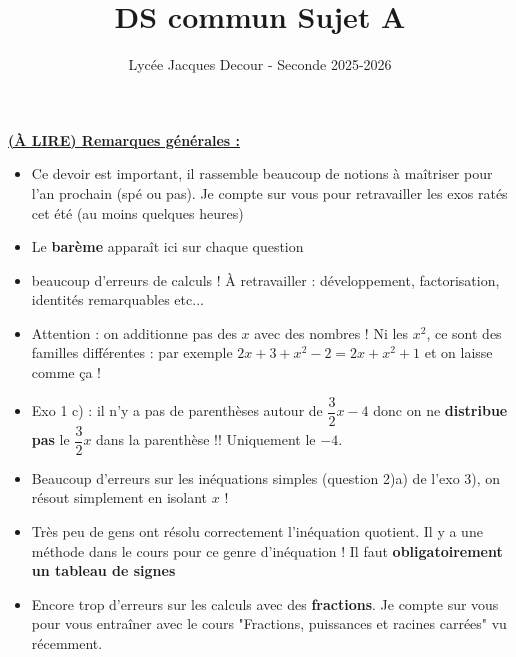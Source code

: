 \documentclass[12pt]{article}
\title{DS commun Sujet A}
\author{Lycée Jacques Decour - Seconde 2025-2026}
\date{}
\begin{document}
\maketitle

{\color{red}
\underline{\textbf{(À LIRE) Remarques générales :}}

\vspace{5pt}
\begin{itemize}
    \item Ce devoir est important, il rassemble beaucoup de notions à maîtriser pour l'an prochain (spé 
    ou pas). Je compte sur vous pour retravailler les exos ratés cet été (au moins quelques heures)

    \vspace{5pt}
    \item Le \textbf{barème} apparaît ici sur chaque question 
    
    \vspace{5pt}
    \item beaucoup d'erreurs de calculs ! À retravailler : développement, factorisation, identités 
    remarquables etc...

    \vspace{5pt}
    \item Attention : on additionne pas des $x$ avec des nombres ! Ni les $x^2$, ce sont des 
    familles différentes : par exemple $2x + 3 + x^2 - 2 = 2x + x^2 + 1$ et on laisse comme ça !
    
    \vspace{5pt}
    \item Exo 1 c) : il n'y a pas de parenthèses autour de $\dfrac{3}{2}x - 4$ donc on ne 
    \textbf{distribue pas} le $\dfrac{3}{2}x$ dans la parenthèse !! Uniquement le $-4$.

    \vspace{5pt}
    \item Beaucoup d'erreurs sur les inéquations simples (question 2)a) de l'exo 3), on résout simplement en isolant 
    $x$ !

    \vspace{5pt}
    \item Très peu de gens ont résolu correctement l'inéquation quotient. Il y a une méthode dans le cours pour ce genre 
    d'inéquation ! Il faut \textbf{obligatoirement un tableau de signes}

    \vspace{5pt}
    \item Encore trop d'erreurs sur les calculs avec des \textbf{fractions}. Je compte sur vous pour vous entraîner avec le cours 
    "Fractions, puissances et racines carrées" vu récemment.
\end{itemize}
}
\end{document}

